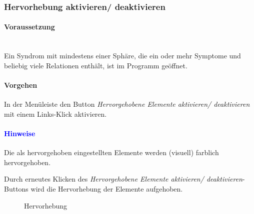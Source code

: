 \documentclass[enabledeprecatedfontcommands,fontsize=11pt,paper=a4,twoside]{scrartcl}
\newcounter{one}
\newcounter{two}[one]
\newcommand*{\hint}{\paragraph{\textcolor{blue}{Hinweise}}}
\newcommand*{\condition}{\paragraph{Voraussetzung}$\;$ \vspace{0.2cm}\\}
\newcommand*{\action}{\paragraph{Vorgehen}}
\let\tempone\itemize
\let\temptwo\enditemize
\renewenvironment{itemize}{\tempone\addtolength{\itemsep}{-10.0pt}}{\temptwo}
\let\origenumerate\enumerate
\let\origendenumerate\endenumerate
\renewenvironment{enumerate}{\origenumerate \addtolength{\itemsep}{-10.0pt}}{\origendenumerate}
\begin{document}
\subsubsection{Hervorhebung aktivieren/ deaktivieren}
	\condition 	
Ein Syndrom mit mindestens einer Sphäre, die ein oder mehr Symptome und beliebig viele Relationen enthält, ist im Programm geöffnet.
\action
\begin{enumerate}
	\item In der Menüleiste den Button \textit{Hervorgehobene Elemente aktivieren/ deaktivieren} mit einem Links-Klick aktivieren.
\end{enumerate}
\hint
\begin{itemize}
	\item Die als hervorgehoben eingestellten Elemente werden (visuell) farblich hervorgehoben. 
	\item Durch erneutes Klicken des \textit{Hervorgehobene Elemente aktivieren/ deaktivieren}-Buttons wird die Hervorhebung der Elemente aufgehoben. \\
\end{itemize}

\begin{figure}[ht!]
	\centering
	\caption{Hervorhebung}
	
\end{figure}
\end{document}
